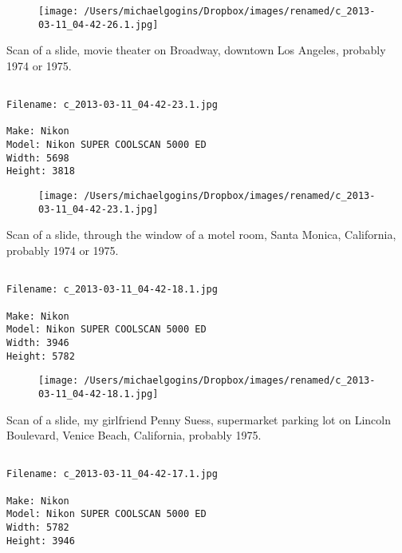 \documentclass[11pt,letter,DIV=14,paper=landscape]{scrbook}
\begin{document}
\begin{figure}
\texttt{[image: /Users/michaelgogins/Dropbox/images/renamed/c\_2013-03-11\_04-42-26.1.jpg]}
\end{figure}
    
\clearpage
\noindent Scan of a slide, movie theater on Broadway, downtown Los Angeles, probably 1974 or 1975.
\noindent
\begin{lstlisting}

Filename: c_2013-03-11_04-42-23.1.jpg

Make: Nikon
Model: Nikon SUPER COOLSCAN 5000 ED
Width: 5698
Height: 3818
\end{lstlisting}
\clearpage

\begin{figure}
\texttt{[image: /Users/michaelgogins/Dropbox/images/renamed/c\_2013-03-11\_04-42-23.1.jpg]}
\end{figure}
    
\clearpage
\noindent Scan of a slide, through the window of a motel room, Santa Monica, California, probably 1974 or 1975.
\noindent
\begin{lstlisting}

Filename: c_2013-03-11_04-42-18.1.jpg

Make: Nikon
Model: Nikon SUPER COOLSCAN 5000 ED
Width: 3946
Height: 5782
\end{lstlisting}
\clearpage

\begin{figure}
\texttt{[image: /Users/michaelgogins/Dropbox/images/renamed/c\_2013-03-11\_04-42-18.1.jpg]}
\end{figure}
    
\clearpage
\noindent Scan of a slide, my girlfriend Penny Suess, supermarket parking lot on Lincoln Boulevard, Venice Beach, California, probably 1975.
\noindent
\begin{lstlisting}

Filename: c_2013-03-11_04-42-17.1.jpg

Make: Nikon
Model: Nikon SUPER COOLSCAN 5000 ED
Width: 5782
Height: 3946
\end{lstlisting}
\clearpage
\end{document}
